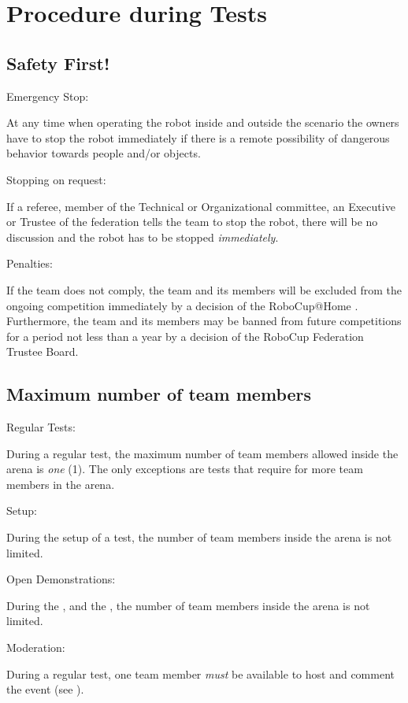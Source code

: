 \section{Procedure during Tests}

\subsection{Safety First!}
\label{rule:safetyfirst}
\begin{enumerate}
	{\bf\item Emergency Stop:} At any time when operating the robot inside and outside the scenario the owners have to stop the robot immediately if there is a remote possibility of dangerous behavior towards people and/or objects. 
	{\bf\item Stopping on request:} If a referee, member of the Technical or Organizational committee, an Executive or Trustee of the federation tells the team to stop the robot, there will be no discussion and the robot has to be stopped \emph{immediately}.
	{\bf\item Penalties:} If the team does not comply, the team and its members will be excluded from the ongoing competition immediately by a decision of the RoboCup@Home . 	Furthermore, the team and its members may be banned from future competitions for a period not less than a year by a decision of the RoboCup Federation Trustee Board.
\end{enumerate}

\subsection{Maximum number of team members}
\label{rule:number_of_people}
\begin{enumerate}
	{\bf\item Regular Tests:} During a regular test, the maximum number of team members allowed inside the arena is \emph{one} (1). The only exceptions are tests that require for more team members in the arena.
	{\bf\item Setup:} During the setup of a test, the number of team members inside the arena is not limited.
	{\bf\item Open Demonstrations:} During the , and the , the number of team members inside the arena is not limited. 
	{\bf\item Moderation:} During a regular test, one team member \emph{must} be available to host and comment the event (see ).
\end{enumerate}

